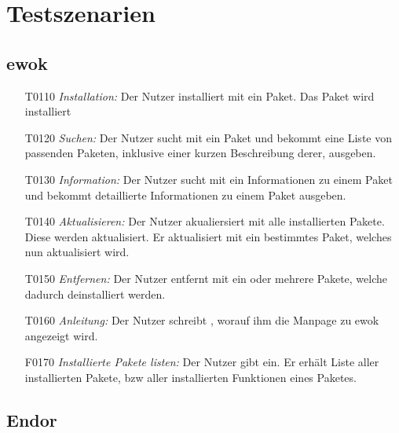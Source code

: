 \chapter{Testszenarien}

\section{ewok}

\begin{itemize}
	\item[T0110] \textit{Installation:} Der Nutzer installiert mit  ein Paket. Das Paket wird installiert
	\item[T0120] \textit{Suchen:} Der Nutzer sucht mit  ein Paket und bekommt eine Liste von passenden Paketen, inklusive einer kurzen Beschreibung derer, ausgeben.
	\item[T0130] \textit{Information:} Der Nutzer sucht mit  ein Informationen zu einem Paket und bekommt detaillierte Informationen zu einem Paket ausgeben.
	\item[T0140] \textit{Aktualisieren:} Der Nutzer akualiersiert mit  alle installierten Pakete. Diese werden aktualisiert. Er aktualisiert mit  ein bestimmtes Paket, welches nun aktualisiert wird.

	\item[T0150] \textit{Entfernen:} Der Nutzer entfernt mit  ein oder mehrere Pakete, welche dadurch deinstalliert werden.
	\item[T0160] \textit{Anleitung:} Der Nutzer schreibt , worauf ihm die Manpage zu ewok angezeigt wird.
	\item[F0170] \textit{Installierte Pakete listen:} Der Nutzer gibt  ein. Er erhält Liste aller installierten Pakete, bzw aller installierten Funktionen eines Paketes.


\end{itemize}

\section{Endor}

